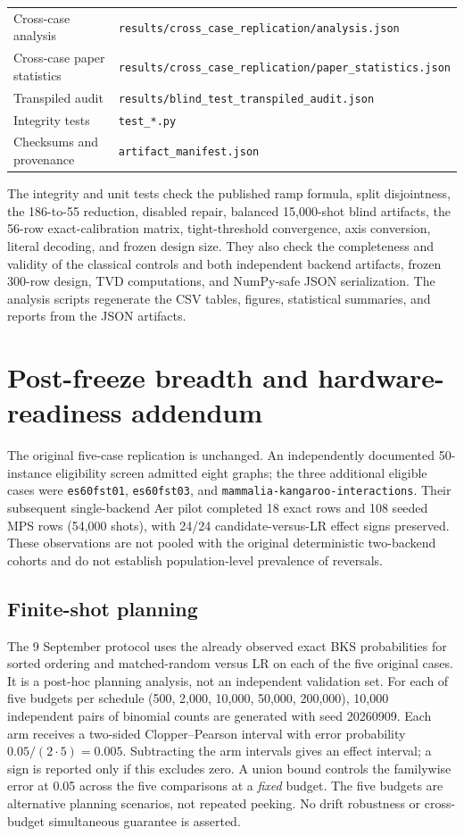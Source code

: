 \documentclass[10pt]{article}
\begin{document}
\begin{table}[H]
\begin{tabularx}{\textwidth}{lX}
Cross-case analysis & \texttt{results/cross\_case\_replication/analysis.json} \\
Cross-case paper statistics & \texttt{results/cross\_case\_replication/paper\_statistics.json} \\
Transpiled audit & \texttt{results/blind\_test\_transpiled\_audit.json} \\
Integrity tests & \texttt{test\_*.py} \\
Checksums and provenance & \texttt{artifact\_manifest.json} \\
\bottomrule
\end{tabularx}
\end{table}

The integrity and unit tests check the published ramp formula, split
disjointness, the 186-to-55 reduction, disabled repair, balanced 15,000-shot
blind artifacts, the 56-row exact-calibration matrix, tight-threshold
convergence, axis conversion, literal decoding, and frozen design size. They
also check the completeness and validity of the classical controls and both
independent backend artifacts, frozen 300-row design, TVD computations, and
NumPy-safe JSON serialization. The analysis
scripts regenerate the CSV tables, figures, statistical summaries, and reports
from the JSON artifacts.

\section{Post-freeze breadth and hardware-readiness addendum}

The original five-case replication is unchanged. An independently documented
50-instance eligibility screen admitted eight graphs; the three additional
eligible cases were \texttt{es60fst01}, \texttt{es60fst03}, and
\texttt{mammalia-kangaroo-interactions}. Their subsequent single-backend Aer
pilot completed 18 exact rows and 108 seeded MPS rows (54,000 shots), with
24/24 candidate-versus-LR effect signs preserved. These observations are not
pooled with the original deterministic two-backend cohorts and do not
establish population-level prevalence of reversals.

\subsection{Finite-shot planning}

The 9 September protocol uses the already observed exact BKS probabilities
for sorted ordering and matched-random versus LR on each of the five original
cases. It is a post-hoc planning analysis, not an independent validation set.
For each of five budgets per schedule (500, 2,000, 10,000, 50,000, 200,000),
10,000 independent pairs of binomial counts are generated with seed 20260909.
Each arm receives a two-sided Clopper--Pearson interval with error probability
$0.05/(2\cdot5)=0.005$. Subtracting the arm intervals gives an effect interval;
a sign is reported only if this excludes zero. A union bound controls the
familywise error at 0.05 across the five comparisons at a \emph{fixed} budget.
The five budgets are alternative planning scenarios, not repeated peeking.
No drift robustness or cross-budget simultaneous guarantee is asserted.
\end{document}
